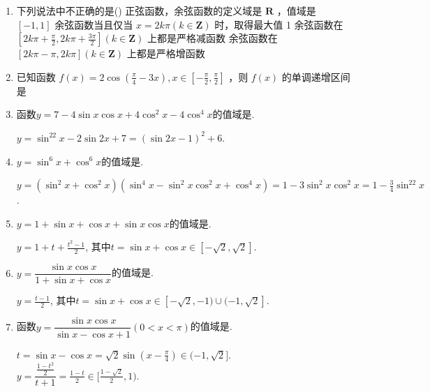 \begin{enumerate}
    \item 下列说法中不正确的是\dotfill()
\xx
{正弦函数，余弦函数的定义域是 $\mathbf{R}$ ，值域是 $[-1,1]$}
{余弦函数当且仅当 $x=2 k \pi(k \in \mathbf{Z})$ 时，取得最大值 1}
{余弦函数在 $\left[2 k \pi+\frac{\pi}{2}, 2 k \pi+\frac{3 \pi}{2}\right](k \in \mathbf{Z})$ 上都是严格减函数}
{余弦函数在 $[2 k \pi-\pi, 2 k \pi](k \in \mathbf{Z})$ 上都是严格增函数}

\item 已知函数 $f(x)=2 \cos \left(\frac{\pi}{4}-3 x\right), x \in\left[-\frac{\pi}{2}, \frac{\pi}{2}\right]$ ，则 $f(x)$ 的单调递增区间是

\item 函数$y=7-4\sin{x}\cos{x}+4\cos^2x-4\cos^4x$的值域是\blkda{$[6,10]$}. 
\begin{jieda}
$y=\sin^22x-2\sin2x+7=(\sin2x-1)^2+6$. 
\end{jieda}

\item $y=\sin^6x+\cos^6x$的值域是\blkda{$[\frac{1}{4},1]$}. 
\begin{jieda}
$y=(\sin^2x+\cos^2x)(\sin^4x-\sin^2x\cos^2x+\cos^4x)=1-3\sin^2x\cos^2x=1-\frac{3}{4}\sin^22x$. 
\end{jieda}

\item $y=1+\sin{x}+\cos{x}+\sin{x}\cos{x}$的值域是. 
\begin{jieda}
$y=1+t+\frac{t^2-1}{2}$, 其中$t=\sin{x}+\cos{x}\in[-\sqrt{2},\sqrt{2}]$. 
\end{jieda}


\item $y=\dfrac{\sin{x}\cos{x}}{1+\sin{x}+\cos{x}}$的值域是. 
\begin{jieda}
$y=\frac{t-1}{2}$, 其中$t=\sin{x}+\cos{x}\in[-\sqrt{2},-1)\cup(-1,\sqrt{2}]$. 
\end{jieda}


\item 函数$y=\dfrac{\sin{x}\cos{x}}{\sin{x}-\cos{x}+1}(0<x<\pi)$的值域是\blkda{$[\frac{1-\sqrt{2}}{2},1)$}. 
\begin{jieda}
$t=\sin{x}-\cos{x}=\sqrt{2}\sin(x-\frac{\pi}{4})\in(-1,\sqrt{2}]$. \\
$y=\dfrac{\frac{1-t^2}{2}}{t+1}=\frac{1-t}{2}\in[\frac{1-\sqrt{2}}{2},1)$. 
\end{jieda}


\end{enumerate}
